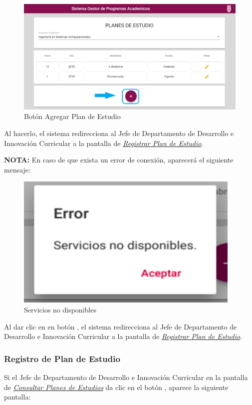 \begin{figure}[!hbtp]
	\centering
	\hypertarget{add}{\includegraphics[width=0.7\linewidth]{images/SP4-GPE/mas}}
	\caption{Botón Agregar Plan de Estudio}
	\label{add}
\end{figure}

Al hacerlo, el sistema redirecciona al Jefe de Departamento de Desarrollo e Innovación Curricular a la pantalla de \hyperlink{registrarPE}{\textit{Registrar Plan de Estudio}}.


\textbf{NOTA:} En caso de que exista un error de conexión, aparecerá el siguiente mensaje:
	\begin{figure}[!hbtp]
	\centering
	\hypertarget{error}{\includegraphics[width=0.7\linewidth]{images/SP4-GPE/error}}
	\caption{Servicios no disponibles}
	\label{error}
\end{figure}

Al dar clic en en botón , el sistema redirecciona  al Jefe de Departamento de Desarrollo e Innovación Curricular a la pantalla de \hyperlink{registrarPE}{\textit{Registrar Plan de Estudio}}. 
\newpage
\subsubsection{Registro de Plan de Estudio}
Si el Jefe de Departamento de Desarrollo e Innovación Curricular en la pantalla de \hyperlink{consultarPE}{\textit{Consultar Planes de Estudios}} da clic en el botón \IUbutton{+}, aparece la siguiente pantalla:

